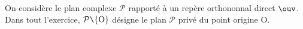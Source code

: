\begin{exercice}
\noindent On consid\`ere le plan complexe $\mathcal{P}$ rapport\'e \`a un rep\`ere orthononnal direct $\ouv$. Dans tout l'exercice, $\mathcal{P}\verb+\+ \{\text{O}\}$ d\'esigne le plan $\mathcal{P}$ priv\'e du point origine O.
\begin{enumerate}
\begin{comment}
\item  \textbf{Question de cours}\\
On prend comme pr\'e-requis les r\'esultats suivants :
\begin{itemize}
\item  Si $z$ et $z'$ sont deux nombres complexes non nuls, alors : arg$(zz') = \text{arg}(z) + \text{arg}(z')$ \`a $2k\pi$ pr\`es, avec $k$ entier relatif
\item Pour tout vecteur $\vect{w}$ non nul d'affixe $z$ on a : arg$(z) = \left(\vect{u}~;~\vect{w}\right)$ \`a $2k\pi$ pr\`es, avec $k$ entier relatif
\end{itemize}
\begin{enumerate}
\item  Soit $z$ et $z'$ des nombres complexes non nuls, d\'emontrer que\\ arg$\left(\dfrac{z}{z'}\right) = \text{arg}(z)- \text{arg}(z')$ \`a $2k\pi$
pr\`es, avec $k$ entier relatif.
\item D\'emontrer que si A, B, C sont trois points du plan, deux \`a deux distincts, d'affixes respectives $a,~ b,~ c$, on a : arg$\left(\dfrac{c - a}{b - a}\right)  = \left(\vect{\text{AB}},~ \vect{\text{AC}}\right)$ \`a $2k\pi$ pr\`es, avec $k$ entier relatif.
\end{enumerate}
\end{comment}


\end{enumerate}
\end{exercice}
